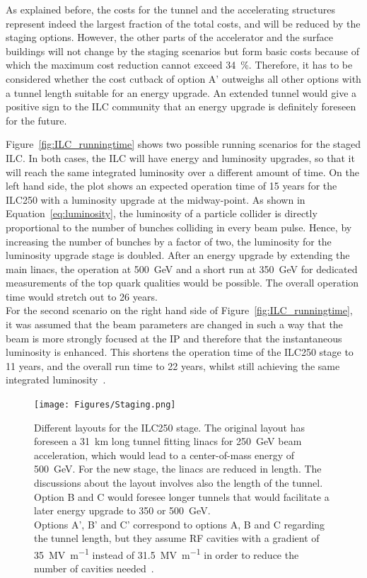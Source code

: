 As explained before, the costs for the tunnel and the accelerating structures represent indeed the largest fraction of the total costs, and will be reduced by the staging options.
However, the other parts of the accelerator and the surface buildings will not change by the staging scenarios but form basic costs because of which the maximum cost reduction cannot exceed \SI{34}{\percent}.
Therefore, it has to be considered whether the cost cutback of option A' outweighs all other options with a tunnel length suitable for an energy upgrade.
An extended tunnel would give a positive sign to the ILC community that an energy upgrade is definitely foreseen for the future.

Figure~\ref{fig:ILC_runningtime} shows two possible running scenarios for the staged ILC.
In both cases, the ILC will have energy and luminosity upgrades, so that it will reach the same integrated luminosity over a different amount of time.
On the left hand side, the plot shows an expected operation time of 15 years for the ILC250 with a luminosity upgrade at the midway-point.
As shown in Equation~\ref{eq:luminosity}, the luminosity of a particle collider is directly proportional to the number of bunches colliding in every beam pulse.
Hence, by increasing the number of bunches by a factor of two, the luminosity for the luminosity upgrade stage is doubled.
After an energy upgrade by extending the main linacs, the operation at \SI{500}{\GeV} and a short run at \SI{350}{\GeV} for dedicated measurements of the top quark qualities would be possible.
The overall operation time would stretch out to 26 years.\\
For the second scenario on the right hand side of Figure~\ref{fig:ILC_runningtime}, it was assumed that the beam parameters are changed in such a way that the beam is more strongly focused at the IP and therefore that the instantaneous luminosity is enhanced.
This shortens the operation time of the ILC250 stage to 11 years, and the overall run time to 22 years, whilst still achieving the same integrated luminosity~\cite[p. 7]{PhysicsCase}.
\begin{figure}
\centering
\texttt{[image: Figures/Staging.png]}
\caption[Different layouts for the ILC250 stage]{Different layouts for the ILC250 stage.
The original layout has foreseen a \SI{31}{\kilo\meter} long tunnel fitting linacs for \SI{250}{\GeV} beam acceleration, which would lead to a center-of-mass energy of \SI{500}{\GeV}.
For the new stage, the linacs are reduced in length.
The discussions about the layout involves also the length of the tunnel.
Option B and C would foresee longer tunnels that would facilitate a later energy upgrade to 350 or \SI{500}{\GeV}.\\
Options A', B' and C' correspond to options A, B and C regarding the tunnel length, but they assume RF cavities with a gradient of \SI{35}{\mega\volt\per\meter} instead of \SI{31.5}{\mega\volt\per\meter} in order to reduce the number of cavities needed~\cite[p. 19]{Staging}.}
\label{fig:Staging}
\end{figure}
